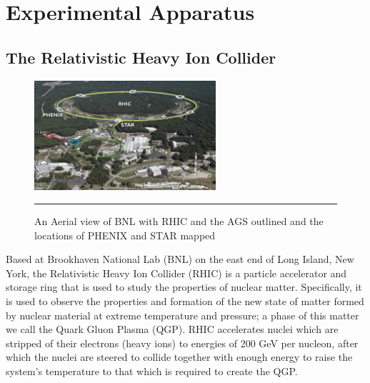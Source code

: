 
\chapter{Experimental Apparatus} %
\label{apparatus}

\section{The Relativistic Heavy Ion Collider}
\begin{figure}[htbp]
  \centering
    \includegraphics[width=0.6\textwidth]{Figures/RHIC-aerial-HR.jpg}
    \rule{35em}{0.5pt}
  \caption[An Aerial view of BNL]{An Aerial view of BNL with RHIC and the AGS outlined and the locations of PHENIX and STAR mapped}
  \label{fig:Aerial RHIC}
\end{figure}
\indent Based at Brookhaven National Lab (BNL) on the east end of Long Island, New York, the Relativistic Heavy Ion Collider (RHIC) is a particle accelerator and storage ring that is used to study the properties of nuclear matter. Specifically, it is used to observe the properties and formation of the new state of matter formed by nuclear material at extreme temperature and pressure; a phase of this matter we call the Quark Gluon Plasma (QGP). RHIC accelerates nuclei which are stripped of their electrons (heavy ions) to energies of 200 GeV per nucleon, after which the nuclei are steered to collide together with enough energy to raise the system's temperature to that which is required to create the QGP. 

